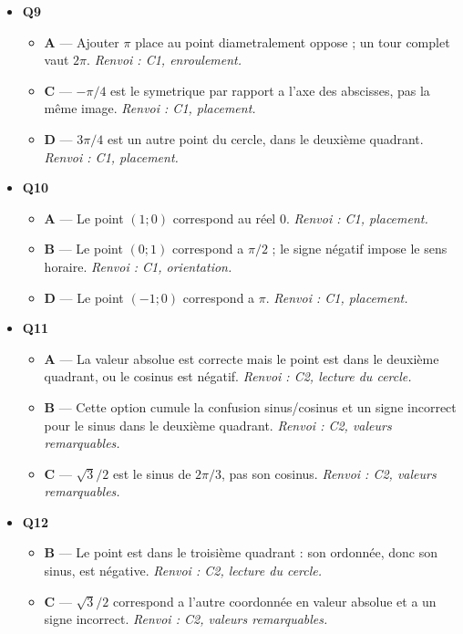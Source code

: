 \begin{itemize}
\begin{itemize}
  \end{itemize}
  \item \textbf{Q9}
  \begin{itemize}
    \item \textbf{A} — Ajouter $\pi$ place au point diametralement oppose ; un tour complet vaut $2\pi$. \emph{Renvoi : C1, enroulement.}
    \item \textbf{C} — $-\pi/4$ est le symetrique par rapport a l'axe des abscisses, pas la même image. \emph{Renvoi : C1, placement.}
    \item \textbf{D} — $3\pi/4$ est un autre point du cercle, dans le deuxième quadrant. \emph{Renvoi : C1, placement.}
  \end{itemize}
  \item \textbf{Q10}
  \begin{itemize}
    \item \textbf{A} — Le point $(1;0)$ correspond au réel $0$. \emph{Renvoi : C1, placement.}
    \item \textbf{B} — Le point $(0;1)$ correspond a $\pi/2$ ; le signe négatif impose le sens horaire. \emph{Renvoi : C1, orientation.}
    \item \textbf{D} — Le point $(-1;0)$ correspond a $\pi$. \emph{Renvoi : C1, placement.}
  \end{itemize}
  \item \textbf{Q11}
  \begin{itemize}
    \item \textbf{A} — La valeur absolue est correcte mais le point est dans le deuxième quadrant, ou le cosinus est négatif. \emph{Renvoi : C2, lecture du cercle.}
    \item \textbf{B} — Cette option cumule la confusion sinus/cosinus et un signe incorrect pour le sinus dans le deuxième quadrant. \emph{Renvoi : C2, valeurs remarquables.}
    \item \textbf{C} — $\sqrt3/2$ est le sinus de $2\pi/3$, pas son cosinus. \emph{Renvoi : C2, valeurs remarquables.}
  \end{itemize}
  \item \textbf{Q12}
  \begin{itemize}
    \item \textbf{B} — Le point est dans le troisième quadrant : son ordonnée, donc son sinus, est négative. \emph{Renvoi : C2, lecture du cercle.}
    \item \textbf{C} — $\sqrt3/2$ correspond a l'autre coordonnée en valeur absolue et a un signe incorrect. \emph{Renvoi : C2, valeurs remarquables.}

\end{itemize}
\end{itemize}
